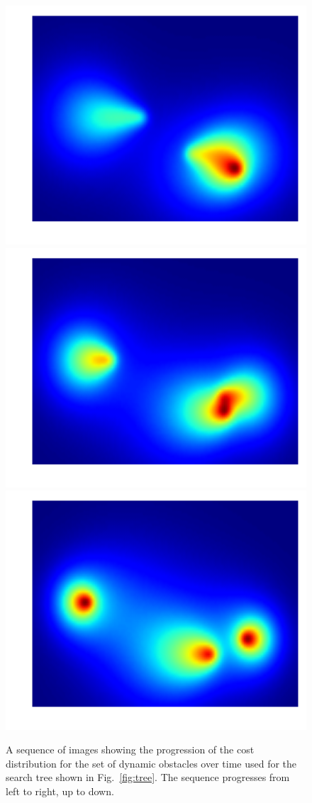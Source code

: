 \documentclass[letterpaper, 10pt, conference]{ieeeconf}
\renewcommand{\algorithmicrequire}{\textbf{Input:}}
\renewcommand{\algorithmicensure}{\textbf{Output:}}
\newcommand{\Function}[1]{\ensuremath{{ \textsc{#1}}}}
\begin{document}
\begin{figure}[h!]
    \includegraphics[width=0.32\linewidth]{figs/ex_agent_6}
    \includegraphics[width=0.32\linewidth]{figs/ex_agent_7}
    \includegraphics[width=0.32\linewidth]{figs/ex_agent_8}

    \caption{A sequence of images showing the progression of the cost
    distribution for the set of dynamic obstacles over time used for the search
tree shown in Fig.~\ref{fig:tree}. The sequence progresses from left to right,
up to down.}

    \label{fig:ex_agents}
\end{figure}


\end{document}
